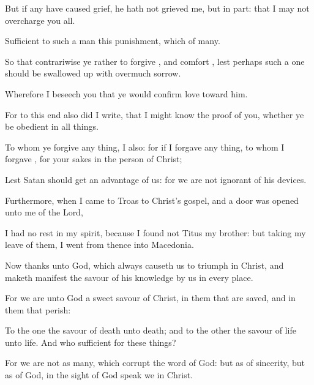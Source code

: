 {But
if
any have caused
grief, he
hath
not
grieved
me,
but
in
part:
that I
may
not
overcharge
you
all.

Sufficient to such a
man
{}
this
punishment,
which
{}
of
many.

So
that
contrariwise
ye
{}
rather to
forgive
{},
and
comfort
{}, lest
perhaps such a
one should be swallowed
up with
overmuch
sorrow.

Wherefore I
beseech
you that ye would
confirm
{}
love
toward
him.

For
to this
end
also did I
write,
that I might
know the
proof of
you,
whether ye
be
obedient
in all
things.

To
whom ye
forgive any
thing,
I
{}
also:
for
if
I
forgave any
thing, to
whom I
forgave
{},
for your
sakes
{}
in the
person of
Christ;

Lest
Satan should get an
advantage
of us:
for we
are
not
ignorant of
his
devices.

Furthermore, when I
came
to
Troas
to
{}
Christ’s
gospel,
and a
door was
opened unto
me
of the
Lord,

I
had
no
rest
in
my
spirit, because
I
found
not
Titus
my
brother:
but taking my
leave of
them, I went from
thence
into
Macedonia.

Now
thanks
{} unto
God, which
always
causeth
us to triumph
in
Christ,
and maketh
manifest the
savour of
his
knowledge
by
us
in
every
place.

For we
are unto
God a sweet
savour of
Christ,
in them
that are
saved,
and
in them
that
perish:

To the
one
{} the
savour of
death
unto
death;
and to the
other the
savour of
life
unto
life.
And
who
{}
sufficient
for these
things?

For we
are
not
as
many, which
corrupt the
word of
God:
but
as
of
sincerity,
but
as
of
God, in the
sight of
God speak
we
in
Christ.




\par }
